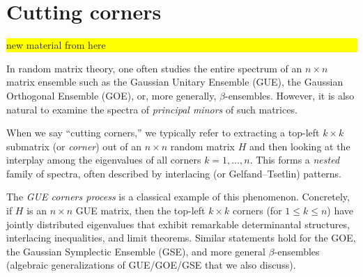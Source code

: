 \documentclass[letterpaper,11pt,oneside,reqno]{article}
\numberwithin{equation}{section}
\theoremstyle{definition}
\begin{document}
\section{Cutting corners}







\colorbox{yellow}{\parbox{.7\textwidth}{new material from here}}


In random matrix theory, one often studies the entire spectrum of an $n\times n$ matrix ensemble such as the Gaussian Unitary Ensemble (GUE), the Gaussian Orthogonal Ensemble (GOE), or, more generally, $\beta$-ensembles. However, it is also natural to examine the spectra of \emph{principal minors} of such matrices.

When we say ``cutting corners,'' we typically refer to extracting a top-left $k\times k$ submatrix (or \emph{corner}) out of an $n\times n$ random matrix $H$ and then looking at the interplay among the eigenvalues of all corners $k=1,\dots,n$. This forms a \emph{nested} family of spectra, often described by interlacing (or Gelfand--Tsetlin) patterns.

The \emph{GUE corners process} is a classical example of this phenomenon. Concretely, if $H$ is an $n\times n$ GUE matrix, then the top-left $k\times k$ corners (for $1\le k\le n$) have jointly distributed eigenvalues that exhibit remarkable determinantal structures, interlacing inequalities, and limit theorems. Similar statements hold for the GOE, the Gaussian Symplectic Ensemble (GSE), and more general $\beta$-ensembles (algebraic generalizations of GUE/GOE/GSE that we also discuss).
\end{document}
